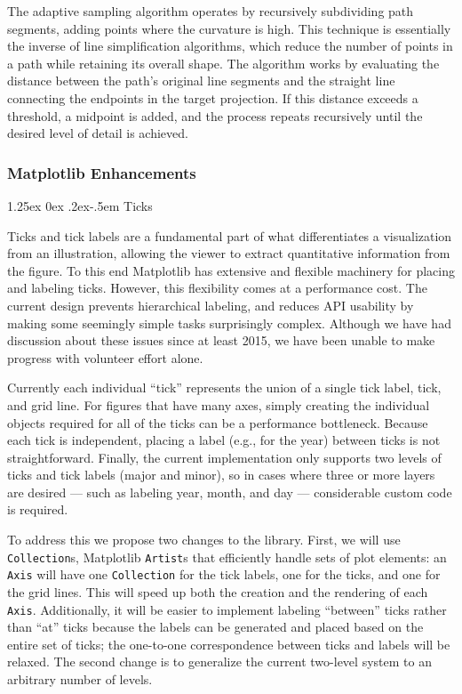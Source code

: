 \documentclass[12pt]{article}
\makeatletter
\numberwithin{page}{section}
\renewcommand{\paragraph}{%
  \@startsection{paragraph}{4}%
  {\z@}{1.25ex \@plus 0ex \@minus .2ex}{-.5em}%
  {\normalfont\normalsize\itshape\bfseries}%
}
\makeatother
\begin{document}
The adaptive sampling algorithm operates by recursively subdividing path segments,
adding points where the curvature is high.
This technique is essentially the inverse of line simplification algorithms,
which reduce the number of points in a path while retaining its overall shape.
The algorithm works by evaluating
the distance between the path's original line segments and the straight line
connecting the endpoints in the target projection. If this distance exceeds a
threshold, a midpoint is added, and the process repeats recursively until
the desired level of detail is achieved.


\subsubsection{Matplotlib Enhancements}

\paragraph{Ticks}

Ticks and tick labels are a fundamental part of what differentiates a
visualization from an illustration, allowing the viewer to extract quantitative
information from the figure.  To this end Matplotlib has extensive and flexible
machinery for placing and labeling ticks.  However, this flexibility comes at a
performance cost. The current design prevents hierarchical
labeling, and reduces API usability by making some seemingly simple tasks
surprisingly complex. Although we have had discussion about these issues since
at least 2015, we have been unable to make progress with
volunteer effort alone.


Currently each individual ``tick''
represents the union of a single tick label, tick, and grid line.  For
figures that have many axes, simply creating the individual objects required
for all of the ticks can be a performance bottleneck.
Because each tick is independent, placing a label (e.g., for the year) between
ticks is not straightforward.  Finally, the current implementation only supports
two levels of ticks and tick labels (major and minor), so in cases where three or
more layers are desired ---
such as labeling year, month, and day --- considerable custom code is required.

To address this we propose two changes to the library.  First, we will use
\texttt{Collection}s, Matplotlib \texttt{Artist}s that efficiently handle sets of plot
elements: an \texttt{Axis} will have one \texttt{Collection} for the tick labels, one for the
ticks, and one for the grid lines.  This will speed up both the creation and
the rendering of each \texttt{Axis}.
Additionally, it will be easier to implement
labeling ``between'' ticks rather than ``at'' ticks because the labels can be
generated and placed based on the entire set of ticks; the one-to-one
correspondence between ticks and labels will be relaxed.
The second change is to generalize
the current two-level system to an arbitrary number of levels.
\end{document}
